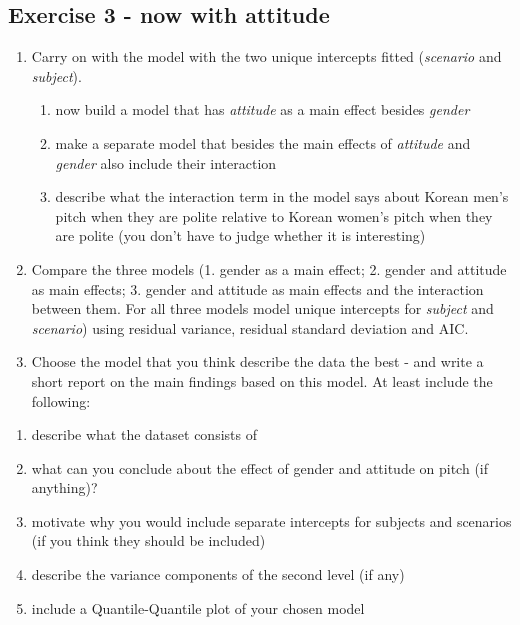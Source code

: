 \documentclass[
]{article}
\providecommand{\tightlist}{%
  \setlength{\itemsep}{0pt}\setlength{\parskip}{0pt}}
\begin{document}
\hypertarget{exercise-3---now-with-attitude}{%
\subsection{Exercise 3 - now with
attitude}\label{exercise-3---now-with-attitude}}

\begin{enumerate}
\def\labelenumi{\arabic{enumi})}
\tightlist
\item
  Carry on with the model with the two unique intercepts fitted
  (\emph{scenario} and \emph{subject}).

  \begin{enumerate}
  \def\labelenumii{\roman{enumii}.}
  \tightlist
  \item
    now build a model that has \emph{attitude} as a main effect besides
    \emph{gender}
  \item
    make a separate model that besides the main effects of
    \emph{attitude} and \emph{gender} also include their interaction
  \item
    describe what the interaction term in the model says about Korean
    men's pitch when they are polite relative to Korean women's pitch
    when they are polite (you don't have to judge whether it is
    interesting)\\
  \end{enumerate}
\item
  Compare the three models (1. gender as a main effect; 2. gender and
  attitude as main effects; 3. gender and attitude as main effects and
  the interaction between them. For all three models model unique
  intercepts for \emph{subject} and \emph{scenario}) using residual
  variance, residual standard deviation and AIC.\\
\item
  Choose the model that you think describe the data the best - and write
  a short report on the main findings based on this model. At least
  include the following:
\end{enumerate}

\begin{enumerate}
\def\labelenumi{\roman{enumi}.}
\tightlist
\item
  describe what the dataset consists of\\
\item
  what can you conclude about the effect of gender and attitude on pitch
  (if anything)?\\
\item
  motivate why you would include separate intercepts for subjects and
  scenarios (if you think they should be included)\\
\item
  describe the variance components of the second level (if any)\\
\item
  include a Quantile-Quantile plot of your chosen model
\end{enumerate}
\end{document}
